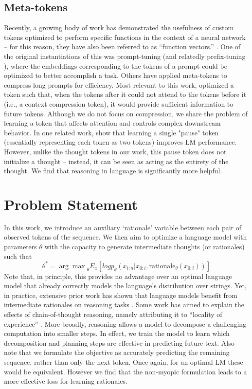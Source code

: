 \documentclass{article} %
\begin{document}
\subsection{Meta-tokens}
Recently, a growing body of work has demonstrated the usefulness of custom tokens optimized to perform specific functions in the context of a neural network -- for this reason, they have also been referred to as ``function vectors.'' \citep{todd2023function}. One of the original instantiations of this was prompt-tuning \citep{lester2021power} (and relatedly prefix-tuning \citep{li2021prefix}), where the embeddings corresponding to the tokens of a prompt could be optimized to better accomplish a task. Others have applied meta-tokens to compress long prompts \citep{li2023compressing,jung2023discrete} for efficiency. Most relevant to this work, \citet{mu2024learning} optimized a token such that, when the tokens after it could not attend to the tokens before it (i.e., a context compression token), it would provide sufficient information to future tokens. Although we do not focus on compression, we share the problem of learning a token that affects attention and controls complex downstream behavior. In one related work, \citet{goyal2023think} show that learning a single "pause" token (essentially representing each token as two tokens) improves LM performance. However, unlike the thought tokens in our work, this pause token does not initialize a thought -- instead, it can be seen as acting as the entirety of the thought. We find that reasoning in language is significantly more helpful.

\vspace{-3px}
\section{Problem Statement}\vspace{-3px}
In this work, we introduce an auxiliary `rationale' variable between each pair of  observed tokens of the sequence.
We then aim to optimize a language model with parameters $\theta$ with the capacity to generate intermediate thoughts (or rationales) such that
$$\theta^* = {\arg\max}_\theta E_x \left[ logp_\theta\left(x_{i:n}|x_{0:i},\mathrm{rationale}_\theta\left(x_{0:i}\right)\right) \right]$$
Note that, in principle, this provides no advantage over an optimal language model that already correctly models the language's distribution over strings. Yet, in practice, extensive prior work has shown that language models benefit from intermediate rationales on reasoning tasks \citep{nye2021show,zelikman2022star, wei_chain_2022}. Some work has aimed to explain the effects of chain-of-thought reasoning, namely attributing it to ``locality of experience'' \citep{prystawski2024think}. More broadly, reasoning allows a model to decompose a challenging computation into smaller steps. In effect, we train the model to learn which decomposition and planning steps are effective in predicting future text.
Also note that we formulate the objective as accurately predicting the remaining sequence, rather than only the next token. Once again, for an optimal LM these would be equivalent. However we find that the non-myopic formulation leads to a more effective loss for learning rationales.
\end{document}
